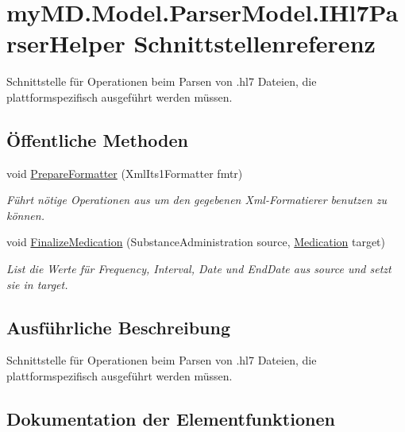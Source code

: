 \hypertarget{interfacemy_m_d_1_1_model_1_1_parser_model_1_1_i_hl7_parser_helper}{}\section{my\+M\+D.\+Model.\+Parser\+Model.\+I\+Hl7\+Parser\+Helper Schnittstellenreferenz}
\label{interfacemy_m_d_1_1_model_1_1_parser_model_1_1_i_hl7_parser_helper}


Schnittstelle für Operationen beim Parsen von .hl7 Dateien, die plattformspezifisch ausgeführt werden müssen.  


\subsection*{Öffentliche Methoden}
\begin{DoxyCompactItemize}
\item 
void \mbox{\hyperlink{interfacemy_m_d_1_1_model_1_1_parser_model_1_1_i_hl7_parser_helper_ab4114a84678d1b0ce5df7fdc00119dc4}{Prepare\+Formatter}} (Xml\+Its1\+Formatter fmtr)
\begin{DoxyCompactList}\small\item\em Führt nötige Operationen aus um den gegebenen Xml-\/\+Formatierer benutzen zu können. \end{DoxyCompactList}\item 
void \mbox{\hyperlink{interfacemy_m_d_1_1_model_1_1_parser_model_1_1_i_hl7_parser_helper_acb71b41f4c50af3442b036e79ac53da1}{Finalize\+Medication}} (Substance\+Administration source, \mbox{\hyperlink{classmy_m_d_1_1_model_1_1_data_model_1_1_medication}{Medication}} target)
\begin{DoxyCompactList}\small\item\em List die Werte für Frequency, Interval, Date und End\+Date aus source und setzt sie in target. \end{DoxyCompactList}\end{DoxyCompactItemize}


\subsection{Ausführliche Beschreibung}
Schnittstelle für Operationen beim Parsen von .hl7 Dateien, die plattformspezifisch ausgeführt werden müssen. 



\subsection{Dokumentation der Elementfunktionen}
\mbox{\label{interfacemy_m_d_1_1_model_1_1_parser_model_1_1_i_hl7_parser_helper_acb71b41f4c50af3442b036e79ac53da1}} 

